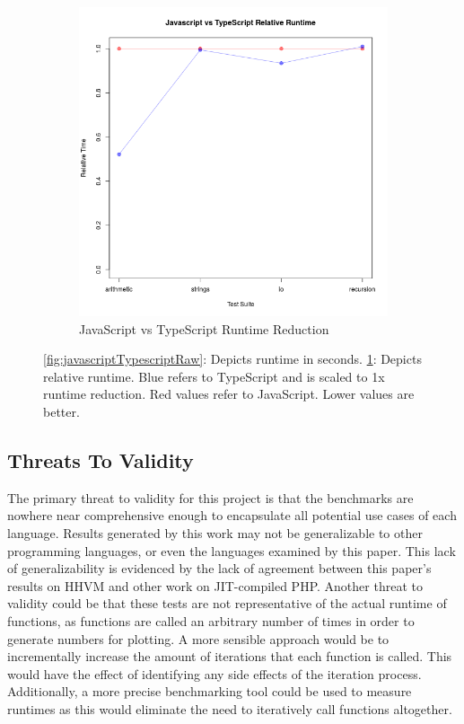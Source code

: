 \begin{figure}[H]
\begin{subfigure}{.5\textwidth}
  \includegraphics[width=\linewidth]{../src/Javascript_typed_vs_untyped_relative.png}
  \caption{JavaScript vs TypeScript Runtime Reduction}
  \label{fig:javascriptTypescriptRelative}
\end{subfigure}
\caption{\ref{fig:javascriptTypescriptRaw}: Depicts runtime in seconds. \ref{fig:javascriptTypescriptRelative}: Depicts relative runtime. Blue refers to TypeScript  and is scaled to 1x runtime reduction. Red values refer to JavaScript. Lower values are better.}
\label{fig:javascriptTypescript}
\end{figure}


\subsection{Threats To Validity}
The primary threat to validity for this project is that the benchmarks are nowhere near comprehensive enough to encapsulate all potential use cases of each language. Results generated by this work may not be generalizable to other programming languages, or even the languages examined by this paper. This lack of generalizability is evidenced by the lack of agreement between this paper's results on HHVM and other work on JIT-compiled PHP.
Another threat to validity could be that these tests are not representative of the actual runtime of functions, as functions are called an arbitrary number of times in order to generate numbers for plotting. A more sensible approach would be to incrementally increase the amount of iterations that each function is called. This would have the effect of identifying any side effects of the iteration process. Additionally, a more precise benchmarking tool could be used to measure runtimes as this would eliminate the need to iteratively call functions altogether.


